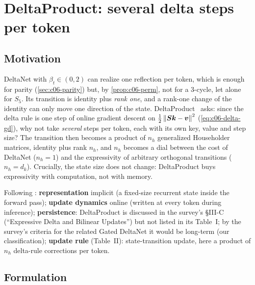 \section{DeltaProduct: several delta steps per token}\label{sec:c06-deltaproduct}

\subsection{Motivation}

DeltaNet with $\beta_t\in(0,2)$ can realize one reflection per token, which is enough for
parity (\cref{sec:c06-parity}) but, by \cref{prop:c06-perm}, not for a 3-cycle, let alone
for $S_5$. Its transition is identity plus \emph{rank one}, and a rank-one change of the
identity can only move one direction of the state. DeltaProduct~\citep{siems2025deltaproduct}
asks: since the delta rule is one step of online gradient descent on
$\tfrac12\left\lVert \bm{S}\bm{k}-\bm{v}\right\rVert^2$ (\cref{eq:c06-delta-gd}), why not take \emph{several} steps per
token, each with its own key, value and step size? The transition then becomes a product
of $n_h$ generalized Householder matrices, identity plus rank $n_h$, and $n_h$ becomes a
dial between the cost of DeltaNet ($n_h=1$) and the expressivity of arbitrary orthogonal
transitions ($n_h=d_k$). Crucially, the state size does not change: DeltaProduct buys
expressivity with computation, not with memory.

\begin{taxonomy}
Following \citet{zhoubian2026memory}: \textbf{representation} implicit (a fixed-size
recurrent state inside the forward pass); \textbf{update dynamics} online (written at every
token during inference); \textbf{persistence}: DeltaProduct is discussed in the survey's
\S III-C (``Expressive Delta and Bilinear Updates'') but not listed in its Table~I; by the
survey's criteria for the related Gated DeltaNet it would be long-term (our
classification); \textbf{update rule} (Table~II): state-transition update, here a product of
$n_h$ delta-rule corrections per token.
\end{taxonomy}

\subsection{Formulation}\label{sec:c06-dp-formulation}

